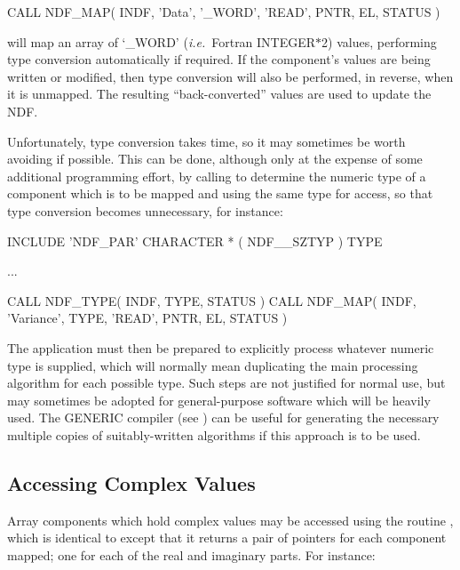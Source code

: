 \documentclass[twoside,11pt,nolof]{starlink}
\providecommand{\st}[1]{{\emph{#1}}}
\begin{document}
\small
\begin{terminalv}
      CALL NDF_MAP( INDF, 'Data', '_WORD', 'READ', PNTR, EL, STATUS )
\end{terminalv}
\normalsize

will map an array of `\_WORD' (\st{i.e.}\ Fortran INTEGER$*$2) values,
performing type conversion automatically if required.
If the component's values are being written or modified, then type
conversion will also be performed, in reverse, when it is unmapped.
The resulting ``back-converted'' values are used to update the NDF.

Unfortunately, type conversion takes time, so it may sometimes be worth
avoiding if possible.
This can be done, although only at the expense of some additional
programming effort, by calling  to determine the numeric type of a
component which is to be mapped and using the same type for access, so that
type conversion becomes unnecessary, for instance:

\small
\begin{terminalv}
      INCLUDE 'NDF_PAR'
      CHARACTER * ( NDF__SZTYP ) TYPE

      ...

      CALL NDF_TYPE( INDF, TYPE, STATUS )
      CALL NDF_MAP( INDF, 'Variance', TYPE, 'READ', PNTR, EL, STATUS )
\end{terminalv}
\normalsize

The application must then be prepared to explicitly process whatever numeric
type is supplied, which will normally mean duplicating the main processing
algorithm for each possible type.
Such steps are not justified for normal use, but may sometimes be adopted
for general-purpose software which will be heavily used.
The GENERIC compiler (see ) can be useful for
generating the necessary multiple copies of suitably-written
algorithms if this approach is to be used.

\subsection{\label{ss:complexaccess}Accessing Complex Values}

Array components which hold complex values may be accessed using the
routine , which is identical to  except that it returns a
pair of pointers for each component mapped; one for each of the real and
imaginary parts.
For instance:
\end{document}
